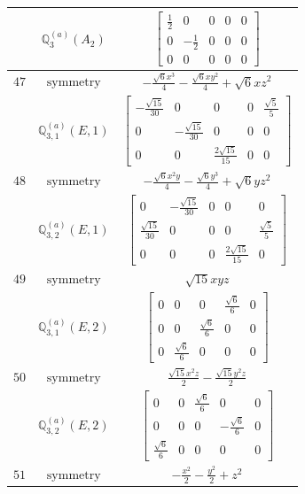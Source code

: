 \documentclass[fleqn,8pt,landscape]{jsarticle}
\begin{document}
\begin{longtable}{ccc}
$  $ & $ \mathbb{Q}_{3}^{(a)}(A_{2}) $ & $ \begin{bmatrix} \frac{1}{2} & 0 & 0 & 0 & 0 \\ 0 & - \frac{1}{2} & 0 & 0 & 0 \\ 0 & 0 & 0 & 0 & 0 \end{bmatrix} $ \\ \hline
$ 47 $ & $ \text{symmetry} $ & $ - \frac{\sqrt{6} x^{3}}{4} - \frac{\sqrt{6} x y^{2}}{4} + \sqrt{6} x z^{2} $ \\
$  $ & $ \mathbb{Q}_{3,1}^{(a)}(E,1) $ & $ \begin{bmatrix} - \frac{\sqrt{15}}{30} & 0 & 0 & 0 & \frac{\sqrt{5}}{5} \\ 0 & - \frac{\sqrt{15}}{30} & 0 & 0 & 0 \\ 0 & 0 & \frac{2 \sqrt{15}}{15} & 0 & 0 \end{bmatrix} $ \\ \hline
$ 48 $ & $ \text{symmetry} $ & $ - \frac{\sqrt{6} x^{2} y}{4} - \frac{\sqrt{6} y^{3}}{4} + \sqrt{6} y z^{2} $ \\
$  $ & $ \mathbb{Q}_{3,2}^{(a)}(E,1) $ & $ \begin{bmatrix} 0 & - \frac{\sqrt{15}}{30} & 0 & 0 & 0 \\ \frac{\sqrt{15}}{30} & 0 & 0 & 0 & \frac{\sqrt{5}}{5} \\ 0 & 0 & 0 & \frac{2 \sqrt{15}}{15} & 0 \end{bmatrix} $ \\ \hline
$ 49 $ & $ \text{symmetry} $ & $ \sqrt{15} x y z $ \\
$  $ & $ \mathbb{Q}_{3,1}^{(a)}(E,2) $ & $ \begin{bmatrix} 0 & 0 & 0 & \frac{\sqrt{6}}{6} & 0 \\ 0 & 0 & \frac{\sqrt{6}}{6} & 0 & 0 \\ 0 & \frac{\sqrt{6}}{6} & 0 & 0 & 0 \end{bmatrix} $ \\ \hline
$ 50 $ & $ \text{symmetry} $ & $ \frac{\sqrt{15} x^{2} z}{2} - \frac{\sqrt{15} y^{2} z}{2} $ \\
$  $ & $ \mathbb{Q}_{3,2}^{(a)}(E,2) $ & $ \begin{bmatrix} 0 & 0 & \frac{\sqrt{6}}{6} & 0 & 0 \\ 0 & 0 & 0 & - \frac{\sqrt{6}}{6} & 0 \\ \frac{\sqrt{6}}{6} & 0 & 0 & 0 & 0 \end{bmatrix} $ \\ \hline
$ 51 $ & $ \text{symmetry} $ & $ - \frac{x^{2}}{2} - \frac{y^{2}}{2} + z^{2} $ \\

\end{longtable}
\end{document}

